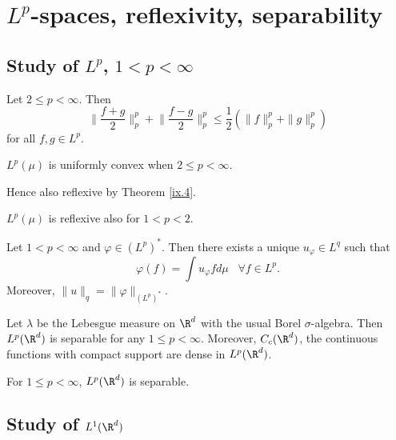 \section{$L^p$-spaces, reflexivity, separability}

\subsection{Study of $L^p$, $1<p<\infty$}

\begin{lem}\label{xi.1}
	Let $2\leq p<\infty$. Then
	\[\Big\|\frac{f+g}{2}\Big\|_p^p+\Big\|\frac{f-g}{2}\Big\|_p^p\leq\frac{1}{2}(\|f\|_p^p+\|g\|_p^p)\tag{11.1}\label{11.1}\]
	for all $f,g\in L^p$.
\end{lem}

\begin{lem}\label{xi.2}
	$L^p(\mu)$ is uniformly convex when $2\leq p<\infty$.

    Hence also reflexive by Theorem \ref{ix.4}.
\end{lem}

\begin{thm}\label{xi.3}
	$L^p(\mu)$ is reflexive also for $1<p<2$.
\end{thm}

\begin{thm}\label{xi.4}
	Let $1<p<\infty$ and $\varphi\in\left(L^p\right)^*$. Then there exists a unique $u_\varphi\in L^q$ such that
	\[\varphi(f)=\int u_\varphi fd\mu\;\;\;\forall f\in L^p.\tag{11.6}\label{11.6}\]
	Moreover, $\|u\|_q=\|\varphi\|_{\left(L^p\right)^*}$.
\end{thm}

\begin{thm}\label{xi.5}
	Let $\lambda$ be the Lebesgue measure on $\R^d$ with the usual Borel $\sigma$-algebra. Then $L^p(\R^d)$ is separable for any $1\leq p<\infty$. Moreover, $C_c(\R^d)$, the continuous functions with compact support are dense in $L^p(\R^d)$.

    For \(1 \leq p < \infty\), \(L^p(\R^d)\) is separable.
\end{thm}

\subsection{Study of $L^1(\R^d)$}

